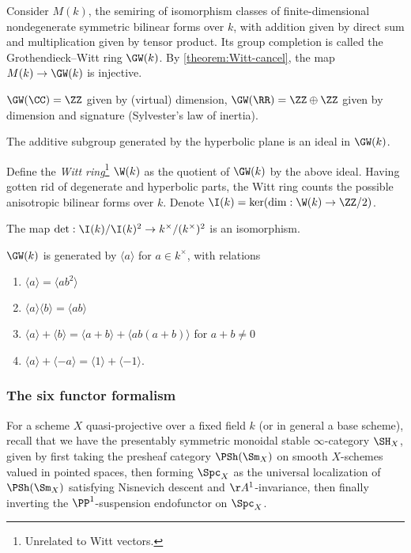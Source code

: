 Consider $M(k)$, the semiring of isomorphism classes of finite-dimensional nondegenerate symmetric bilinear forms over $k$, with addition given by direct sum and multiplication given by tensor product. Its group completion is called the Grothendieck--Witt ring $\GW(k)$. By \cref{theorem:Witt-cancel}, the map $M(k)\to \GW(k)$ is injective.

\begin{exm}
	$\GW(\CC)=\ZZ$ given by (virtual) dimension, $\GW(\RR)=\ZZ\oplus \ZZ$ given by dimension and signature (Sylvester's law of inertia).
\end{exm}

\begin{exr}
	The additive subgroup generated by the hyperbolic plane is an ideal in $\GW(k)$. 
\end{exr}

Define the \emph{Witt ring}\footnote{Unrelated to Witt vectors.} $\W(k)$ as the quotient of $\GW(k)$ by the above ideal. Having gotten rid of degenerate and hyperbolic parts, the Witt ring counts the possible anisotropic bilinear forms over $k$. Denote $\I(k)=\ker(\dim: \W(k)\to \ZZ/2)$.

\begin{proposition}[Milnor's conjecture for $n=1$]
The map $\det: \I(k)/\I(k)^2 \to k^\times/(k^\times)^2$ is an isomorphism.
\end{proposition} 

\begin{proposition}
	$\GW(k)$ is generated by $\langle a\rangle$ for $a\in k^\times$, with relations
	\begin{enumerate}
		\item $\langle a \rangle = \langle ab^2\rangle$
		\item $\langle a \rangle\langle b\rangle = \langle ab\rangle$
		\item $\langle a \rangle + \langle b \rangle = \langle a+b\rangle + \langle ab(a+b)\rangle$ for $a+b\neq 0$
		\item $\langle a\rangle + \langle -a\rangle = \langle 1\rangle + \langle -1 \rangle$.
	\end{enumerate}
\end{proposition}


\subsubsection{The six functor formalism}

For a scheme $X$ quasi-projective over a fixed field $k$ (or in general a base scheme), recall that we have the presentably symmetric monoidal stable $\infty$-category $\SH_X$, given by first taking the presheaf category $\PSh(\Sm_X)$ on smooth $X$-schemes valued in pointed spaces, then forming $\Spc_X$ as the universal localization of $\PSh(\Sm_X)$ satisfying Nisnevich descent and $\AA^1$-invariance, then finally inverting the $\PP^1$-suspension endofunctor on $\Spc_X$. 


